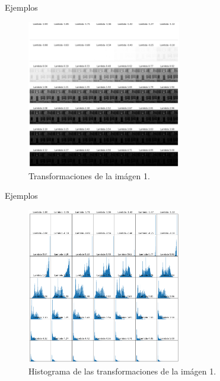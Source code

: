 \documentclass{beamer}
\begin{document}
\begin{frame}{Ejemplos}
    \begin{figure}
        \centering
        \includegraphics[width=0.6\textwidth]{all_lambda_1.png}
        \caption{Transformaciones de la im\'agen 1.}
        \label{fig:all_lambda_1}
    \end{figure}
\end{frame}


\begin{frame}{Ejemplos}

    \begin{figure}
        \centering
        \includegraphics[width=0.6\textwidth]{all_lambda_hist_1.png}
        \caption{Histograma de las transformaciones de la im\'agen 1.}
        \label{fig:img_bci_hist_1}
    \end{figure}
\end{frame}
\end{document}
